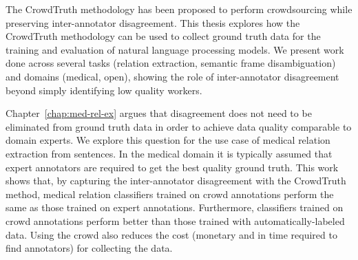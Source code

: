 The CrowdTruth methodology has been proposed to perform crowdsourcing while preserving inter-annotator disagreement.
This thesis explores how the CrowdTruth methodology can be used to collect ground truth data for the training and evaluation of natural language processing models. We present work done across several tasks (relation extraction, semantic frame disambiguation) and domains (medical, open), showing the role of inter-annotator disagreement beyond simply identifying low quality workers.

Chapter~\ref{chap:med-rel-ex} argues that disagreement does not need to be eliminated from ground truth data in order to achieve data quality comparable to domain experts. We explore this question for the use case of medical relation extraction from sentences. In the medical domain it is typically assumed that expert annotators are required to get the best quality ground truth. This work shows that, by capturing the inter-annotator disagreement with the CrowdTruth method, medical relation classifiers trained on crowd annotations perform the same as those trained on expert annotations. Furthermore, classifiers trained on crowd annotations perform better than those trained with automatically-labeled data. Using the crowd also reduces the cost (monetary and in time required to find annotators) for collecting the data.

